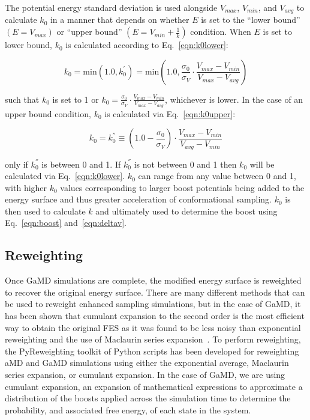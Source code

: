 \documentclass[9pt,tutorial]{livecoms}
\begin{document}
The potential energy standard deviation is used alongside $V_{max}$, $V_{min}$, and $V_{avg}$ to calculate $k_{0}$ in a manner that depends on whether $E$ is set to the ``lower bound'' $\left(E=V_{max}\right)$ or  ``upper bound'' $\left(E=V_{min}+\frac{1}{k}\right)$ condition. When $E$ is set to lower bound, $k_0$ is calculated according to Eq.~\ref{eqn:k0lower}:

\begin{equation}
    k_{0} = \text{min}\left(1.0,k_{0}^{'}\right) = \text{min} \left (1.0, \frac{\sigma_{0}}{\sigma_{V}} \cdot \frac{V_{max} - {V_{min}}}{V_{max} - V_{avg}} \right) 
    \label{eqn:k0lower}
\end{equation}

such that $k_{0}$ is set to 1 or $k_{0} = \frac{\sigma_{0}}{\sigma_{V}} \cdot \frac{V_{max} - {V_{min}}}{V_{max} - V_{avg}}$, whichever is lower. In the case of an upper bound condition, $k_{0}$ is calculated via Eq.~\ref{eqn:k0upper}:

\begin{equation}
    k_{0} = k_{0}^{''} \equiv \left (1.0 - \frac{\sigma_{0}}{\sigma_{V}} \right) \cdot \frac{V_{max} - {V_{min}}}{V_{avg} - V_{min}}
    \label{eqn:k0upper}
\end{equation}

only if $k_{0}^{''}$ is between 0 and 1. If $k_{0}^{''}$ is not between 0 and 1 then $k_{0}$ will be calculated via Eq.~\ref{eqn:k0lower}. $k_{0}$ can range from any value between 0 and 1, with higher $k_{0}$ values corresponding to larger boost potentials being added to the energy surface and thus greater acceleration of conformational sampling. $k_{0}$ is then used to calculate $k$ and ultimately used to determine the boost using Eq.~\ref{eqn:boost} and~\ref{eqn:deltav}.

\bigskip
\subsection{Reweighting}
\label{ss:reweighting}
Once GaMD simulations are complete, the modified energy surface is reweighted to recover the original energy surface. There are many different methods that can be used to reweight enhanced sampling simulations, but in the case of GaMD, it has been shown that cumulant expansion to the second order is the most efficient way to obtain the original FES as it was found to be less noisy than exponential reweighting and the use of Maclaurin series expansion~\cite{miao_improved_2014}. To perform reweighting, the PyReweighting toolkit of Python scripts has been developed for reweighting aMD and GaMD simulations using either the exponential average, Maclaurin series expansion, or cumulant expansion. In the case of GaMD, we are using cumulant expansion, an expansion of mathematical expressions to approximate a distribution of the boosts applied across the simulation time to determine the probability, and associated free energy, of each state in the system. 
\end{document}
